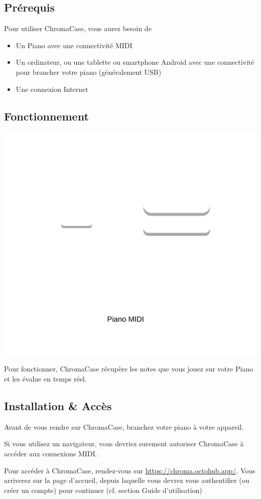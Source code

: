 \subsection{Prérequis}

Pour utiliser ChromaCase, vous aurez besoin de

\begin{itemize}
	\item Un Piano avec une connectivité MIDI
	\item Un ordinateur, ou une tablette ou smartphone Android  avec une connectivité pour brancher votre piano (généralement USB)
	\item Une connexion Internet
\end{itemize}


\subsection{Fonctionnement}
\includegraphics[width=\textwidth]{../assets/structure-front.png}

Pour fonctionner, ChromaCase récupère les notes que vous jouez sur votre Piano et les évalue en temps réel. 

\subsection{Installation \& Accès}

Avant de vous rendre sur ChromaCase, branchez votre piano à votre appareil.

Si vous utilisez un navigateur, vous devriez surement autoriser ChromaCase à accéder aux connexions MIDI.

Pour accéder à ChromaCase, rendez-vous sur \url{https://chroma.octohub.app/}. Vous arriverez sur la page d'accueil, depuis laquelle vous devrez vous authentifier (ou créer un compte) pour continuer (cf. section Guide d'utilisation)
